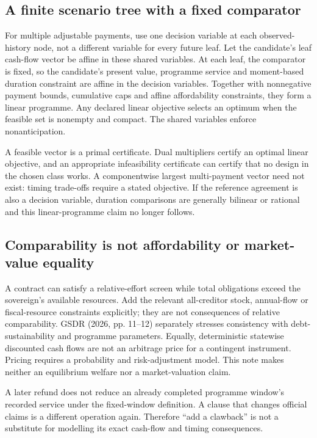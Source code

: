 \documentclass[11pt,a4paper]{article}
\begin{document}
\subsection{A finite scenario tree with a fixed comparator}
For multiple adjustable payments, use one decision variable at each observed-history node, not a different variable for every future leaf. Let the candidate's leaf cash-flow vector be affine in these shared variables. At each leaf, the comparator is fixed, so the candidate's present value, programme service and moment-based duration constraint are affine in the decision variables. Together with nonnegative payment bounds, cumulative caps and affine affordability constraints, they form a linear programme. Any declared linear objective selects an optimum when the feasible set is nonempty and compact. The shared variables enforce nonanticipation.

A feasible vector is a primal certificate. Dual multipliers certify an optimal linear objective, and an appropriate infeasibility certificate can certify that no design in the chosen class works. A componentwise largest multi-payment vector need not exist: timing trade-offs require a stated objective. If the reference agreement is also a decision variable, duration comparisons are generally bilinear or rational and this linear-programme claim no longer follows.

\subsection{Comparability is not affordability or market-value equality}
A contract can satisfy a relative-effort screen while total obligations exceed the sovereign's available resources. Add the relevant all-creditor stock, annual-flow or fiscal-resource constraints explicitly; they are not consequences of relative comparability. GSDR (2026, pp. 11--12) separately stresses consistency with debt-sustainability and programme parameters. Equally, deterministic statewise discounted cash flows are not an arbitrage price for a contingent instrument. Pricing requires a probability and risk-adjustment model. This note makes neither an equilibrium welfare nor a market-valuation claim.

A later refund does not reduce an already completed programme window's recorded service under the fixed-window definition. A clause that changes official claims is a different operation again. Therefore ``add a clawback'' is not a substitute for modelling its exact cash-flow and timing consequences.
\end{document}
